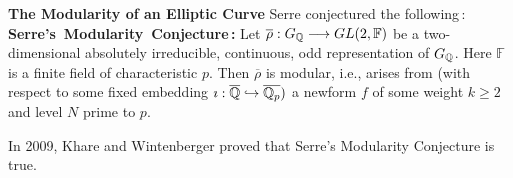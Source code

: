 \documentclass[11pt]{amsart}
\begin{document}
\begin{section}{{\bf The Modularity of an Elliptic Curve}}
\vskip 3mm
Serre \cite{S} conjectured the following\,:
\vskip 2mm\noindent
{\bf Serre's\ Modularity\ Conjecture\,:} Let $\overline{\rho}:G_\mathbb Q\longrightarrow GL(2,{\mathbb F})$ be a two-dimensional
absolutely irreducible, continuous, odd representation of $G_\mathbb Q$. Here $\mathbb F$ is a finite
field of characteristic $p$. Then $\overline{\rho}$ is modular, i.e., arises from (with respect to
some fixed embedding $\imath:\overline{\mathbb Q}\hookrightarrow \overline{\mathbb Q_p})$ a newform $f$ of
some weight $k\geq 2$ and level $N$ prime to $p$.

\vskip 3mm
In 2009, Khare and Wintenberger \cite{K-W1, K-W2} proved that Serre's Modularity Conjecture is true.





\end{section}
\end{document}
